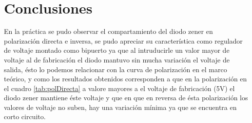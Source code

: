 \documentclass{article}
\begin{document}
\section{Conclusiones}

En la práctica se pudo observar el compartamiento del diodo zener en polarización directa e inversa, se pudo apreciar su característica como regulador de voltaje montado como bipuerto ya que al intruducirle un valor mayor de voltaje al de fabricación el diodo mantuvo sin mucha variación el voltaje de salida, ésto lo podemos relacionar con la curva de polarización en el marco teórico, y como los resultados obtenidos corresponden a que en la polarización en el cuadro \ref{tab:polDirecta} a valore mayores a el voltaje de fabricación (5V) el diodo zener mantiene éste voltaje y que en que en reversa de ésta polarización los valores de voltaje no suben, hay una variación mínima ya que se encuentra en corto circuito.










\end{document}
